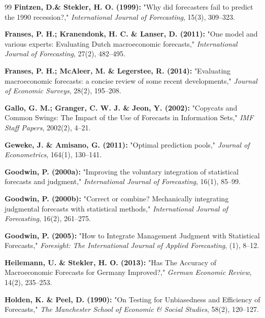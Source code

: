 \documentclass[12pt,a4paper]{article}
\begin{document}
\begin{thebibliography}{99}
	\textbf{Fintzen, D.\& Stekler, H. O. (1999):}
	"Why did forecasters fail to predict the 1990 recession?,"
	\emph{International Journal of Forecasting}, 15(3), 309--323.
	
	\textbf{Franses, P. H.; Kranendonk, H. C. \& Lanser, D. (2011):}
	"One model and various experts: Evaluating Dutch macroeconomic forecasts,"
	\emph{International Journal of Forecasting}, 27(2), 482--495.
	
	\textbf{Franses, P. H.; McAleer, M. \& Legerstee, R. (2014):}
	"Evaluating macroeconomic forecasts: a concise review of some recent developments,"
	\emph{Journal of Economic Surveys}, 28(2), 195--208.
	
	\textbf{Gallo, G. M.; Granger, C. W. J. \& Jeon, Y. (2002):}
	"Copycats and Common Swings: The Impact of the Use of Forecasts in Information Sets,"
	\emph{IMF Staff Papers}, 2002(2), 4--21.
	
	\textbf{Geweke, J. \& Amisano, G. (2011):}
	"Optimal prediction pools,"
	\emph{Journal of Econometrics}, 164(1), 130--141.
	
	\textbf{Goodwin, P. (2000a):}
	"Improving the voluntary integration of statistical forecasts and judgment,"
	\emph{International Journal of Forecasting}, 16(1), 85--99.
	
	\textbf{Goodwin, P. (2000b):}
	"Correct or combine? Mechanically integrating judgmental forecasts with statistical methods,"
	\emph{International Journal of Forecasting}, 16(2), 261--275.
	
	\textbf{Goodwin, P. (2005):}
	"How to Integrate Management Judgment with Statistical Forecasts,"
	\emph{Foresight: The International Journal of Applied Forecasting}, (1), 8--12.
	
	\textbf{Heilemann, U. \& Stekler, H. O. (2013):}
	"Has The Accuracy of Macroeconomic Forecasts for Germany Improved?,"
	\emph{German Economic Review}, 14(2), 235--253.
	
	\textbf{Holden, K. \& Peel, D. (1990):}
	"On Testing for Unbiasedness and Efficiency of Forecasts,"
	\emph{The Manchester School of Economic \& Social Studies}, 58(2), 120--127.
	

\end{thebibliography}
\end{document}
